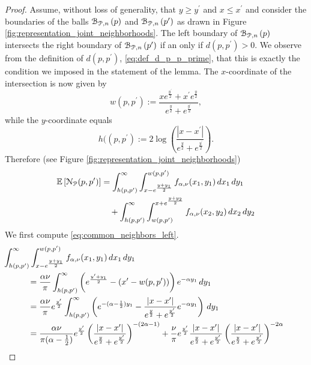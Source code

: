 \begin{appendices}
\begin{proof}
Assume, without loss of generality, that $y \ge y^\prime$ and $x \le x^\prime$ and consider the boundaries of the balls ${\mathcal B}_{{\mathcal P},n}\left(p\right)$ and ${\mathcal B}_{{\mathcal P},n}\left(p^\prime\right)$ as drawn in Figure \ref{fig:representation_joint_neighborhoods}. The left boundary of ${\mathcal B}_{{\mathcal P},n}\left(p\right)$ intersects the right boundary of ${\mathcal B}_{{\mathcal P},n}\left(p^\prime\right)$ if an only if $d(p,p^\prime) > 0$. We observe from the definition of $d(p,p^\prime)$, \eqref{eq:def_d_p_p_prime}, that this is exactly the condition we imposed in the statement of the lemma. The $x$-coordinate of the intersection is now given by
\[
	w(p,p^\prime) := \frac{x e^{\frac{y^\prime}{2}} + x^\prime e^{\frac{y}{2}}}{e^{\frac{y}{2}} + e^{\frac{y^\prime}{2}}},
\]
while the $y$-coordinate equals
\[
	h((p,p^\prime) := 2\log\left(\frac{|x - x^\prime|}{e^{\frac{y}{2}} + e^{\frac{y^\prime}{2}}}\right).
\]
Therefore (see Figure \ref{fig:representation_joint_neighborhoods})
\begin{align}
	\mathbb{E}\left[{\mathcal N}_{{\mathcal P}}(p,p^\prime)\right] 
    &= \int_{h(p,p^\prime)}^{\infty} \int_{x-e^{\frac{y+y_1}{2}}}^{w(p,p^\prime)} f_{\alpha,\nu}(x_1,y_1) \, dx_1 \, dy_1
    	\label{eq:common_neighbors_left}\\
    &\hspace{10pt}+ \int_{h(p,p^\prime)}^{\infty} \int_{w(p,p^\prime)}^{x+e^{\frac{y+y_2}{2}}} f_{\alpha,\nu}(x_2,y_2) \, dx_2 \, dy_2
    	\label{eq:common_neighbors_right}
\end{align}
We first compute \eqref{eq:common_neighbors_left}.
\begin{align*}
	&\hspace{-30pt}\int_{h(p,p^\prime)}^{\infty} \int_{x-e^{\frac{y+y_1}{2}}}^{w(p,p^\prime)} f_{\alpha,\nu}(x_1,y_1) \, dx_1 \, dy_1\\
    &= \frac{\alpha \nu}{\pi} \int_{h(p,p^\prime)}^{\infty} \left(e^{\frac{y^\prime + y_1}{2}} - (x^\prime - w(p,p^\prime))\right) 
    	e^{-\alpha y_1} \, dy_1\\
    &= \frac{\alpha \nu}{\pi}e^{\frac{y^\prime}{2}} \int_{h(p,p^\prime)}^{\infty} \left(e^{-(\alpha -\frac{1}{2})y_1} 
    	- \frac{|x - x^\prime|}{e^{\frac{y}{2}} + e^{\frac{y^\prime}{2}}} e^{-\alpha y_1}\right) \, dy_1\\
    &= \frac{\alpha \nu}{\pi(\alpha - \frac{1}{2})}e^{\frac{y^\prime}{2}}
    	\left(\frac{|x - x^\prime|}{e^{\frac{y}{2}} + e^{\frac{y^\prime}{2}}}\right)^{-(2\alpha - 1)}
    	+ \frac{\nu}{\pi}e^{\frac{y^\prime}{2}} \frac{|x - x^\prime|}{e^{\frac{y}{2}} + e^{\frac{y^\prime}{2}}}
    	\left(\frac{|x - x^\prime|}{e^{\frac{y}{2}} + e^{\frac{y^\prime}{2}}}\right)^{-2\alpha} \\

\end{align*}
\end{proof}
\end{appendices}
